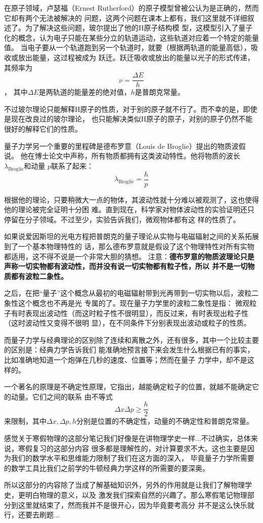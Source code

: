 在原子领域，卢瑟福（Ernest Rutherford）的原子模型曾被公认为是正确的，然而它却有两个无法被解决的
问题，这两个问题在课本上都有，我们这里就不详细叙述了。为了解决这些问题，玻尔提出了他的H原子结构模
型，这模型引入了量子化的概念，认为电子只能在某些分立的轨道运动，这些轨道对应着一个特定的能量值。
当电子要从一个轨道跑到另一个轨道时，就要（根据两轨道的能量高低），吸收或放出能量，这过程被成为
跃迁。跃迁吸收或放出的能量以光子的形式传递，其频率为
\begin{equation}
\nu = \frac{\Delta E}{h}
\end{equation}，
其中$\Delta E$是两轨道的能量差的绝对值，$h$是普朗克常量。

不过玻尔理论只能解释H原子的性质，对于别的原子就不行了。而不幸的是，即使是现在改良过的玻尔理论，
也只能解决类似H原子的原子，对别的原子仍然不能很好的解释它们的性质。

量子力学另一个重要的里程碑是德布罗意（Louis de Broglie）提出的物质波假说。
他在博士论文中声称，所有物质都拥有这类波动特性。他将物质的波长$\lambda_\text{Broglie}$和动量
$p$联系了起来：
\begin{equation}
\lambda_\text{Broglie} = \frac{h}{p}
\end{equation}

根据他的理论，只要稍微大一点的物体，其波动性就十分难以被观测了，这也使得他的理论被完全证明十分困
难。直到现在，科学家对物体波动性的实验证明还只停留在分子领域。不过至少，实验告诉我们，微观物体都有这
样的性质了。

如果说爱因斯坦的光电方程把普朗克的量子理论从实物与电磁辐射之间的关系拓展到了一个基本物理特性的
话，那么德布罗意就是假设了这个物理特性对所有实物都适用，这不得不说是一个非常大胆的猜想。
注意：\textbf{德布罗意的物质波理论只是声称一切实物都有波动性，而并没有说一切实物都有粒子性，所以
并不是一切物质都有波粒二象性。}

之后，在把``量子''这个概念从最初的电磁辐射带到光再带到一切实物以后，波粒二象性这个概念也不再是光
专属的了。现在量子力学里的波粒二象性是指：
微观粒子有时表现出波动性（而这时粒子性不很明显），而反过来，有时表现出粒子性（这时波动性又变得不很明
显），在不同条件下分别表现出波动或粒子的性质。

而量子力学与经典理论的区别除了连续和离散之外，还有很多，其中一个比较主要的区别是：经典力学告诉我们
能准确地预言接下来会发生什么根据已有的事实，比如准确地知道一个炮弹在几秒的速度、位置等；然而在量子
力学中，却不是这样的。

一个著名的原理是不确定性原理，它指出，越能确定粒子的位置，就越不能确定它的动量。它们之间的联系
由不等式
\begin{equation}
\Delta x\Delta p \geq \frac{h}{2}
\end{equation}
来限制，其中$\Delta x,\Delta p,h$分别是位置的不确定性，动量的不确定性和普朗克常量。

感觉关于寒假物理的这部分笔记我们好像是在讲物理学史一样...不过确实，总体来说，寒假复习的这部分内容
很多都是理解性的，对计算要求不大。这也主要是因为我们的数学水平和思维能力限制了我们在这方面的深入，
毕竟量子力学所需要的数学工具比我们之前学的牛顿经典力学这样的所需要的要深奥。

所以这部分的内容除了当成了解基础知识外，另外的作用就是让我们了解物理学史，更明白物理的意义，以及
激发我们探索自然的兴趣了。那么寒假笔记物理部分到这里就结束了，然而我并不是很开心，因为毕竟要考高分
并不是这么快乐就行，还要去刷题...